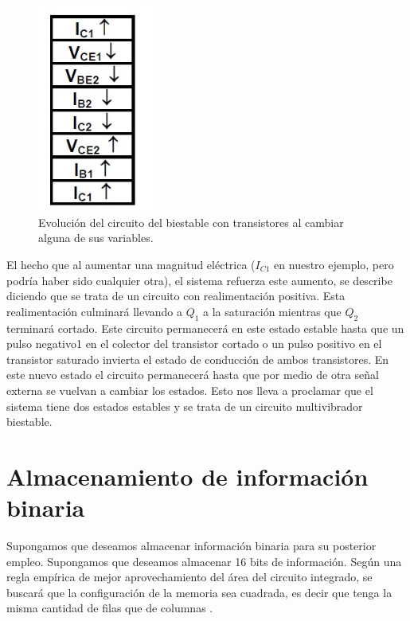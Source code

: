 \documentclass[12pt]{book}
\theoremstyle{definition}
\theoremstyle{remark}
\theoremstyle{plain}
\begin{document}
\begin{figure}
\centering
\includegraphics[width=1.5in]{biestable2.jpg}
\caption{Evolución del circuito del biestable con transistores al cambiar alguna de sus variables.}
\label{fig6}
\end{figure}

El hecho que al aumentar una magnitud eléctrica ($I_{C1}$ en nuestro ejemplo, pero podría haber sido cualquier otra), el sistema refuerza este aumento, se describe diciendo que se trata de un circuito con realimentación positiva.
Esta realimentación culminará llevando a $Q_1$ a la saturación mientras que $Q_2$ terminará cortado.
Este circuito permanecerá en este estado estable hasta que un pulso negativo1 en el colector del transistor cortado o un pulso positivo en el transistor saturado invierta el estado de conducción de ambos transistores. En este nuevo estado el circuito permanecerá hasta que por medio de otra señal externa se vuelvan a cambiar los estados.
Esto nos lleva a proclamar que el sistema tiene dos estados estables y se trata de un circuito multivibrador biestable.


\section{Almacenamiento de información binaria}

Supongamos que deseamos almacenar información binaria para su posterior empleo. Supongamos que deseamos almacenar 16 bits de información. Según una regla empírica de mejor aprovechamiento del área del circuito integrado, se buscará que la configuración de la memoria sea cuadrada, es decir que tenga la misma cantidad de filas que de columnas .
\end{document}
